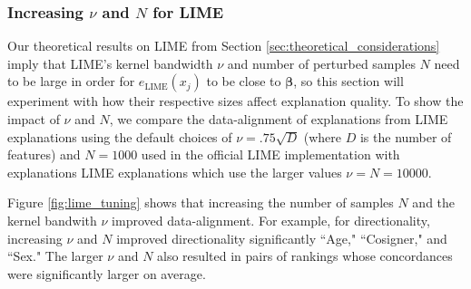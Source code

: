\documentclass[mnsc,blindrev]{informs3}
\begin{document}
        
        \subsubsection{Increasing $\nu$ and $N$ for LIME } 
            \label{sec:lime_params}
            Our theoretical results on LIME from Section \ref{sec:theoretical_considerations} imply that LIME's kernel bandwidth $\nu$ and number of perturbed samples $N$ need to be large in order for $e_{\text{LIME}}(x_j)$ to be close to $\boldsymbol{\beta}$, so this section will experiment with how their respective sizes affect explanation quality. To show the impact of $\nu$ and $N$, we compare the data-alignment of explanations from LIME explanations using the default choices of $\nu = .75\sqrt{D}$ (where $D$ is the number of features) and $N=1000$ used in the official LIME implementation \citep{ribeiro16lime} with explanations LIME explanations which use the larger values $\nu=N=10000$. 
            
            Figure \ref{fig:lime_tuning} shows that increasing the number of samples $N$ and the kernel bandwith $\nu$ improved data-alignment. For example, for directionality, increasing $\nu$ and $N$ improved directionality  significantly  ``Age," ``Cosigner," and ``Sex." The larger $\nu$ and $N$ also resulted in pairs of rankings whose concordances were significantly larger on average.%
        
\end{document}

